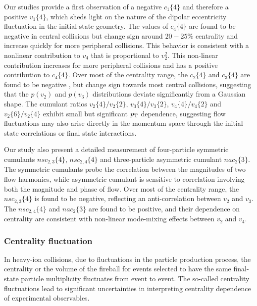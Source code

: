 Our studies provide a first observation of a negative $c_1\{4\}$ and therefore a positive $v_1\{4\}$, which sheds light on the nature of the dipolar eccentricity fluctuation in the initial-state geometry. The values of $c_4\{4\}$ are found to be negative in central collisions but change sign around $20-25\%$ centrality and increase quickly for more peripheral collisions. This behavior is consistent with a nonlinear contribution to $v_4$ that is proportional to $v_2^2$. This non-linear contribution increases for more peripheral collisions and has a positive contribution to $c_4\{4\}$. Over most of the centrality range, the $c_2\{4\}$ and $c_3\{4\}$ are found to be negative , but change sign towards most central collisions, suggesting that the $p(v_2)$ and $p(v_3)$ distributions deviate significantly from a Gaussian shape. The cumulant ratios $v_2\{4\} / v_2\{2\}$, $v_3\{4\} / v_3\{2\}$, $v_4\{4\} / v_4\{2\}$ and $v_2\{6\} / v_2\{4\}$ exhibit small but significant $p_\text{T}$ dependence, suggesting flow fluctuations may also arise directly in the momentum space through the initial state correlations or final state interactions.

Our study also present a detailed measurement of four-particle symmetric cumulants $nsc_{2,3}\{4\}$, $nsc_{2,4}\{4\}$ and three-particle asymmetric cumulant $nac_2\{3\}$. The symmetric cumulants probe the correlation between the magnitudes of two flow harmonics, while asymmetric cumulant is sensitive to correlation involving both the magnitude and phase of flow. Over most of the centrality range, the $nsc_{2,3}\{4\}$ is found to be negative, reflecting an anti-correlation between $v_2$ and $v_3$. The $nsc_{2,4}\{4\}$ and $nac_2\{3\}$ are found to be positive, and their dependence on centrality are consistent with non-linear mode-mixing effects between $v_2$ and $v_4$.

\subsubsection{Centrality fluctuation}

In heavy-ion collisions, due to fluctuations in the particle production process, the centrality or the volume of the fireball for events selected to have the same final-state particle multiplicity fluctuates from event to event. The so-called centrality fluctuations lead to significant uncertainties in interpreting centrality dependence of experimental observables.


